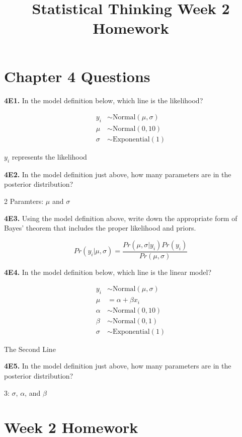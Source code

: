 \documentclass[
  letterpaper,
  DIV=11,
  numbers=noendperiod]{scrartcl}
\title{Statistical Thinking Week 2 Homework}
\author{}
\date{}
\begin{document}
\maketitle


\section{Chapter 4 Questions}\label{chapter-4-questions}

\textbf{4E1.} In the model definition below, which line is the
likelihood?

\[
\begin{align}
y_i &\sim \text{Normal}(\mu, \sigma) \\
\mu &\sim \text{Normal}(0, 10) \\
\sigma &\sim \text{Exponential}(1)
\end{align}
\]

\(y_i\) represents the likelihood

\textbf{4E2.} In the model definition just above, how many parameters
are in the posterior distribution?

2 Paramters: \(\mu\) and \(\sigma\)

\textbf{4E3.} Using the model definition above, write down the
appropriate form of Bayes' theorem that includes the proper likelihood
and priors.

\[
Pr(y_i | \mu, \sigma) = \frac{Pr(\mu, \sigma | y_i )Pr(y_i)}{Pr(\mu, \sigma)}
\]

\textbf{4E4.} In the model definition below, which line is the linear
model?

\[
\begin{align}
y_i &\sim \text{Normal}(\mu, \sigma) \\
\mu &= \alpha + \beta x_i \\
\alpha &\sim \text{Normal}(0, 10) \\
\beta &\sim \text{Normal}(0, 1) \\
\sigma &\sim \text{Exponential}(1)
\end{align}
\]

The Second Line

\textbf{4E5.} In the model definition just above, how many parameters
are in the posterior distribution?

3: \(\sigma\), \(\alpha\), and \(\beta\)

\section{Week 2 Homework}\label{week-2-homework}
\end{document}
